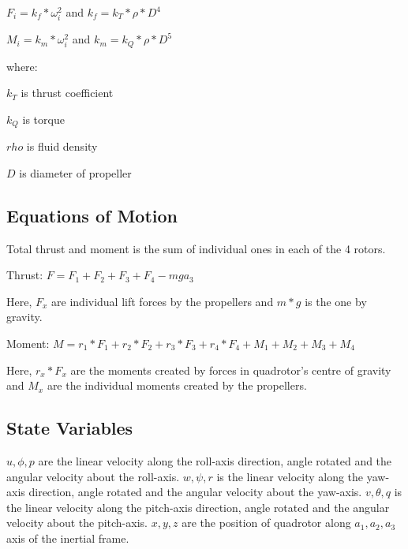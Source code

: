 $F_i = k_f * \omega_i^2$ \hspace{1cm} and \hspace{2cm} $k_f = k_T*\rho * D^4$

$M_i = k_m * \omega_i^2$ \hspace{1cm} and \hspace{1.8cm} $k_m = k_Q*\rho * D^5$

\vspace{10pt}
where:

$k_T$ is thrust coefficient

$k_Q$ is torque 

$rho$ is fluid density

$D$ is diameter of propeller
\\

\subsection{Equations of Motion}


Total thrust and moment is the sum of individual ones in each of the 4 rotors.
\vspace{10pt}

Thrust: $F = F_1 + F_2 + F_3 + F_4 - mga_3$

Here, $F_x$ are individual lift forces by the propellers and $m*g$ is the one by gravity.
\vspace{10pt}

Moment: $M = r_1 * F_1 + r_2 * F_2 + r_3 * F_3 + r_4 * F_4 + M_1 + M_2 + M_3 + M_4$

Here, $r_x*F_x$ are the moments created by forces in quadrotor's centre of gravity and $M_x$ are the individual moments created by the propellers.
\\

\subsection{State Variables}

$u, \phi, p$ are the linear velocity along the roll-axis direction, angle rotated and the angular velocity about the roll-axis.
$w, \psi, r$ is the linear velocity along the yaw-axis direction, angle rotated and the angular velocity about the yaw-axis.
$v, \theta, q$ is the linear velocity along the pitch-axis direction, angle rotated and the angular velocity about the pitch-axis.
$x, y, z$ are the position of quadrotor along $a_1, a_2, a_3$ axis of the inertial frame.
\\


